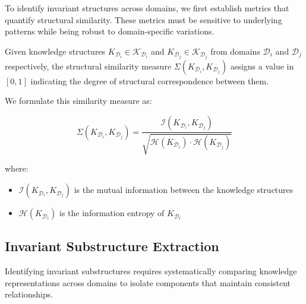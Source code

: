 To identify invariant structures across domains, we first establish metrics that quantify structural similarity. These metrics must be sensitive to underlying patterns while being robust to domain-specific variations.

\begin{definition}
Given knowledge structures $K_{\mathcal{D}_i} \in \mathcal{K}_{\mathcal{D}_i}$ and $K_{\mathcal{D}_j} \in \mathcal{K}_{\mathcal{D}_j}$ from domains $\mathcal{D}_i$ and $\mathcal{D}_j$ respectively, the structural similarity measure $\Sigma(K_{\mathcal{D}_i}, K_{\mathcal{D}_j})$ assigns a value in $[0,1]$ indicating the degree of structural correspondence between them.
\end{definition}

We formulate this similarity measure as:

\begin{equation}
\Sigma(K_{\mathcal{D}_i}, K_{\mathcal{D}_j}) = \frac{\mathcal{I}(K_{\mathcal{D}_i}, K_{\mathcal{D}_j})}{\sqrt{\mathcal{H}(K_{\mathcal{D}_i}) \cdot \mathcal{H}(K_{\mathcal{D}_j})}}
\end{equation}

where:
\begin{itemize}
    \item $\mathcal{I}(K_{\mathcal{D}_i}, K_{\mathcal{D}_j})$ is the mutual information between the knowledge structures
    \item $\mathcal{H}(K_{\mathcal{D}_i})$ is the information entropy of $K_{\mathcal{D}_i}$
\end{itemize}

\subsection{Invariant Substructure Extraction}

Identifying invariant substructures requires systematically comparing knowledge representations across domains to isolate components that maintain consistent relationships.

